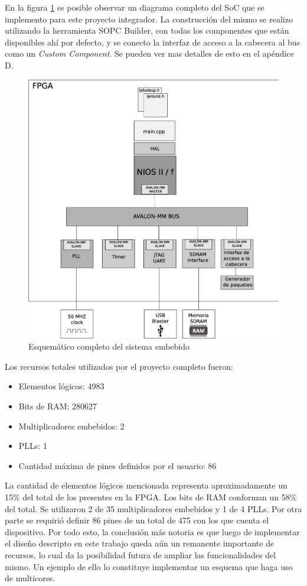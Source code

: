 En la figura \ref{fig:comple} es posible observar un diagrama completo del SoC que se implemento para este proyecto integrador. La construcción del mismo se realizo utilizando la herramienta SOPC Builder, con todas los componentes que están disponibles ahí por defecto, y se conecto la interfaz de acceso a la cabecera al bus como un \textit{Custom Component}. Se pueden ver mas detalles de esto en el apéndice D.
\begin{figure}[H]
  \centering
	\includegraphics[scale=0.28]{4-implementacion/graf/sistema.eps}
  \caption{Esquemático completo del sistema embebido}
  \label{fig:comple}
\end{figure}

Los recursos totales utilizados por el proyecto completo fueron:
\begin{itemize}
\item Elementos lógicos: 4983
	\item Bits de RAM: 280627
	\item Multiplicadores embebidos: 2
	\item PLLs: 1
	\item Cantidad máxima de pines definidos por el usuario: 86
\end{itemize}

La cantidad de elementos lógicos mencionada representa aproximadamente un 15\% del total de los presentes en la FPGA. Los bits de RAM conforman un 58\% del total. Se utilizaron 2 de 35 multiplicadores embebidos y 1 de 4 PLLs. Por otra parte se requirió definir 86 pines de un total de 475 con los que cuenta el dispositivo. Por todo esto, la conclusión más notoria es que luego de implementar el diseño descripto en este trabajo queda aún un remanente importante de recursos, lo cual da la posibilidad futura de ampliar las funcionalidades del mismo. Un ejemplo de ello lo constituye implementar un esquema que haga uso de multicores.

